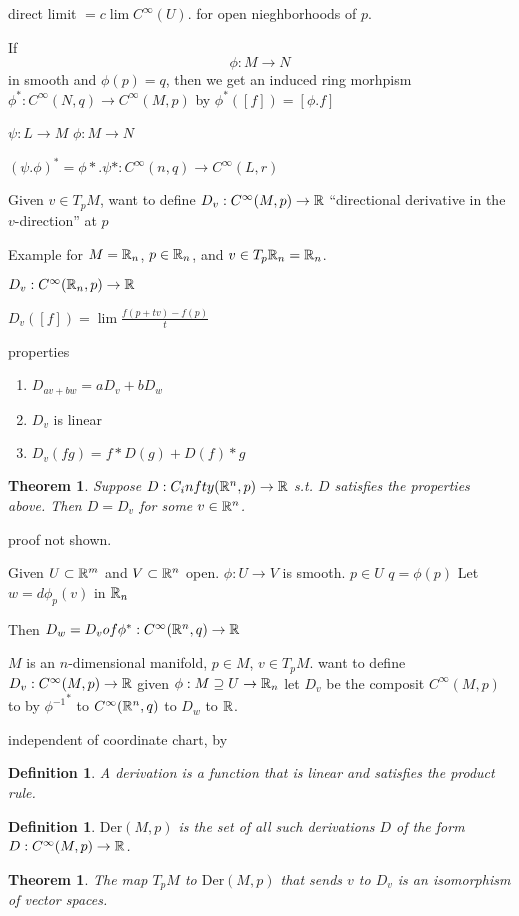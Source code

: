 \documentclass[11pt,leqno,oneside]{amsart}
\newcommand{\Der}{\text{Der}}
\newcommand{\de}{\emph}
\theoremstyle{mystyle} \newtheorem{thrm}[thm]{Theorem}
\theoremstyle{mystyle} \newtheorem{defi}[thm]{Definition}
\begin{document}
direct limit
$= c\lim C^\infty(U)$.
for open nieghborhoods of $p$.

If $$\phi: M \to N$$ in smooth and $\phi(p) = q$, then we get an induced ring morhpism
$\phi^* : C^\infty(N,q) \to C^\infty(M,p)$ by
$\phi^*([f]) = [\phi.f]$

$\psi : L \to M$
$\phi : M \to N$

$(\psi.\phi)^* = \phi*.\psi* : C^\infty(n,q) \to C^\infty(L,r)$

Given $v \in T_pM$, want to define
$D_v : C^\infty(M,p) \to {\mathbb R}$
``directional derivative in the $v$-direction'' at $p$

Example for $M = {\mathbb R}_n$, $p \in {\mathbb R}_n$, and $v \in T_p{\mathbb R}_n = {\mathbb R}_n$.

$D_v : C^\infty({\mathbb R}_n, p) \to {\mathbb R}$

$D_v([f]) = \lim \frac{f(p + tv) - f(p)}{t}$

properties
\begin{prop}
	\begin{enumerate}
		\item $D_{av + bw} = aD_{v} + bD_{w}$
		\item $D_v$ is linear
		\item $D_v(fg) = f*D(g) + D(f)*g$
	\end{enumerate}
\end{prop}
\begin{thrm}
	Suppose $D : C_infty({\mathbb R}^n,p) \to {\mathbb R}$
	s.t. $D$ satisfies the properties above.  Then $D = D_v$ for some $v \in {\mathbb R}^n$.
\end{thrm}
proof not shown.
\begin{lem}
	Given $U \subset {\mathbb R}^m$ and $V \subset {\mathbb R}^n$ open.
	$\phi : U \to V$ is smooth.
	$p \in U$
	$q = \phi(p)$
	Let
	$w = d \phi_p(v)$ in ${\mathbb R}_n$

	Then
	$D_w = D_v of \phi^* : C^\infty({\mathbb R}^n,q) \to {\mathbb R}$

	$M$ is an $n$-dimensional manifold, $p \in M$, $v \in T_pM$.
	want to define
	$D_v : C^\infty(M,p) \to {\mathbb R}$
	given $\phi: M \supseteq U \to {\mathbb R}_n$ let $D_v$ be the composit
	$C^\infty(M, p)$ to by ${\phi^{-1}}^*$ to $C^\infty({\mathbb R}^n,q)$ to $D_w$ to ${\mathbb R}$.

	independent of coordinate chart, by \end{lem}
\begin{lem}
	\end{lem}
\begin{defi}
	A \de{derivation} is a function that is linear and satisfies the product rule.
\end{defi}
\begin{defi}
	$\Der(M,p)$ is the set of all such derivations $D$ of the form $D: C^\infty(M,p) \to {\mathbb R}$.
\end{defi}
\begin{thrm}
	The map $T_pM$ to $\Der(M,p)$
	that sends $v$ to $D_v$
	is an isomorphism of vector spaces.
\end{thrm}
\end{document}
